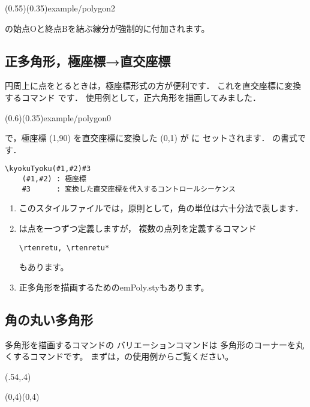 (0.55)(0.35){example/polygon2}

の始点Oと終点Bを結ぶ線分が強制的に付加されます。
\bigskip

\subsection{正多角形，極座標→直交座標}
円周上に点をとるときは，極座標形式の方が便利です．
これを直交座標に変換するコマンド  です．
使用例として，正六角形を描画してみました．

(0.6)(0.35){example/polygon0}

\begin{jquote}
\end{jquote}
で，極座標 (1,90) を直交座標に変換した (0,1) が  に
セットされます． の書式です．

\begin{boxnote}
\begin{verbatim}
\kyokuTyoku(#1,#2)#3
    (#1,#2) : 極座標
    #3      : 変換した直交座標を代入するコントロールシーケンス
\end{verbatim}
\end{boxnote}

\begin{enumerate}[(1)]
  \item このスタイルファイルでは，原則として，角の単位は六十分法で表します．
  \item {}は点を一つずつ定義しますが，
    複数の点列を定義するコマンド
\begin{jquote}
\begin{verbatim}
\rtenretu, \rtenretu*
\end{verbatim}
\end{jquote}
    もあります。
  \item 正多角形を描画するための\textsf{emPoly.sty}もあります。
\end{enumerate}

\subsection{角の丸い多角形}
多角形を描画するコマンドの
バリエーションコマンドは
多角形のコーナーを丸くするコマンドです。
まずは，の使用例からご覧ください。

\begin{showEx}(.54,.4){}
  \begin{zahyou*}%
      [ul=10mm,Ueyohaku=1em,
        Hidariyohaku=1em,%
        Sitayohaku=1em]%
      (0,4)(0,4)
    \Takakkei{\A\B\C\D}
  \end{zahyou*}
\end{showEx}

